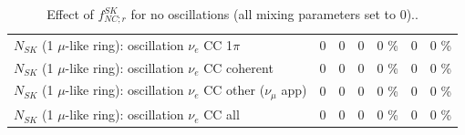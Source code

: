 \begin{table}
\begin{tabular}{| l | r | r | r  r | r  r |}
                     $N_{SK}$ (1 $\mu$-like ring): oscillation $\nu_e$ CC 1$\pi$ &               0 &               0 &               0 &        0 \%  &               0 &        0 \%  \\ 
                   $N_{SK}$ (1 $\mu$-like ring): oscillation $\nu_e$ CC coherent &               0 &               0 &               0 &        0 \%  &               0 &        0 \%  \\ 
      $N_{SK}$ (1 $\mu$-like ring): oscillation $\nu_e$ CC other ($\nu_\mu$ app) &               0 &               0 &               0 &        0 \%  &               0 &        0 \%  \\ 
                       $N_{SK}$ (1 $\mu$-like ring): oscillation $\nu_e$  CC all &               0 &               0 &               0 &        0 \%  &               0 &        0 \%  \\ 
\hline
\hline
\end{tabular}
\caption{ Effect of $f_{NC; r}^{SK}$ for no oscillations (all mixing parameters set to 0).. }
\label{tab:num_sk_1Rmu_nc_eff_1RmuT_3f_osc_t13:0}
\end{table}
\clearpage
